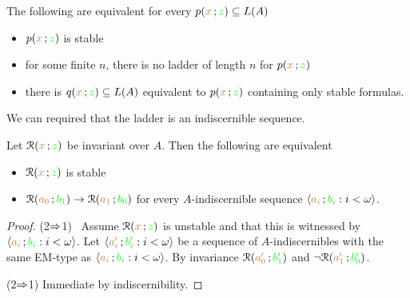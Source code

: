\begin{fact}\label{}
  The following are equivalent for every $p({\color{brown} x}\,;{\color{green} z})\subseteq L(A)$
  \begin{itemize}
    \item [1.] $p({\color{brown} x}\,;{\color{green} z})$ is stable
    \item [1.] for some finite $n$, there is no ladder of length $n$ for $p({\color{brown} x}\,;{\color{green} z})$
    \item [2.] there is $q({\color{brown} x}\,;{\color{green} z})\subseteq L(A)$ equivalent to $p({\color{brown} x}\,;{\color{green} z})$ containing only stable formulas.
  \end{itemize}
\end{fact}

We can required that the ladder is an indiscernible sequence. 

\begin{theorem}\label{thm_sability_indiscernibility}
  Let $\EuScript R({\color{brown} x}\,;{\color{green} z})$ be invariant over $A$.
  Then the following are equivalent
  \begin{itemize}
    \item[1.] $\EuScript R({\color{brown} x}\,;{\color{green} z})$ is stable
    \item[2.] $\EuScript R({\color{brown} a_0}\,;{\color{green} b_1})\rightarrow\EuScript R({\color{brown} a_1}\,;{\color{green} b_0})$ for every $A$-indiscernible sequence $\langle{\color{brown}a_i}\,;{\color{green} b_i} : i<\omega\rangle$.
  \end{itemize}
\end{theorem}

\begin{proof}
  (2$\Rightarrow$1) \ Assume $\EuScript R({\color{brown} x}\,;{\color{green} z})$ is unstable and that this is witnessed by $\langle{\color{brown}a_i}\,;{\color{green} b_i} : i<\omega\rangle$.
  Let $\langle{\color{brown}a'_i}\,;{\color{green} b'_i} : i<\omega\rangle$ be a sequence of $A$-indiscernibles with the same EM-type as $\langle{\color{brown}a_i}\,;{\color{green} b_i} : i<\omega\rangle$.
  By invariance $\EuScript R({\color{brown} a'_0}\,;{\color{green} b'_1})$ and $\neg\EuScript R({\color{brown} a'_1}\,;{\color{green} b'_0})$.

  (2$\Rightarrow$1) Immediate by indiscernibility.
\end{proof}


